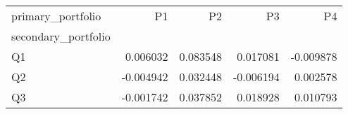 \begin{tabular}{lrrrr}
\toprule
primary_portfolio & P1 & P2 & P3 & P4 \\
secondary_portfolio &  &  &  &  \\
\midrule
Q1 & 0.006032 & 0.083548 & 0.017081 & -0.009878 \\
Q2 & -0.004942 & 0.032448 & -0.006194 & 0.002578 \\
Q3 & -0.001742 & 0.037852 & 0.018928 & 0.010793 \\
\bottomrule
\end{tabular}
